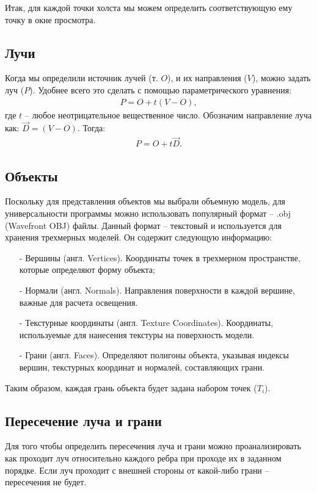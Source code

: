 Итак, для каждой точки холста мы можем определить соответствующую ему точку в окне просмотра.

\subsection{Лучи}

Когда мы определили источник лучей (т. $O$), и их направления ($V$), можно задать луч ($P$). Удобнее всего это сделать с помощью параметрического уравнения:
\begin{gather}
	P = O+t(V-O),
\end{gather}
где $t$ – любое неотрицательное вещественное число. Обозначим направление луча как: $\vec{D}=(V-O)$. Тогда:
\begin{gather}
	P = O+t\vec{D}.
\end{gather}

\subsection{Объекты}

Поскольку для представления объектов мы выбрали объемную модель, для универсальности программы можно использовать популярный формат – .obj (Wavefront OBJ) файлы. Данный формат – текстовый и используется для хранения трехмерных моделей. Он содержит следующую информацию:
\begin{itemize}[label=\arabic*)]
	\item[-] Вершины (англ. Vertices). Координаты точек в трехмерном пространстве, которые определяют форму объекта;
	\item[-] Нормали (англ. Normals). Направления поверхности в каждой вершине, важные для расчета освещения.
	\item[-] Текстурные координаты (англ. Texture Coordinates). Координаты, используемые для нанесения текстуры на поверхность модели.
	\item[-] Грани (англ. Faces). Определяют полигоны объекта, указывая индексы вершин, текстурных координат и нормалей, составляющих грани.
\end{itemize}

Таким образом, каждая грань объекта будет задана набором точек ($T_{i}$).

\subsection{Пересечение луча и грани}

Для того чтобы определить пересечения луча и грани можно проанализировать как проходит луч относительно каждого ребра при проходе их в заданном порядке. Если луч проходит с внешней стороны от какой-либо грани – пересечения не будет.

